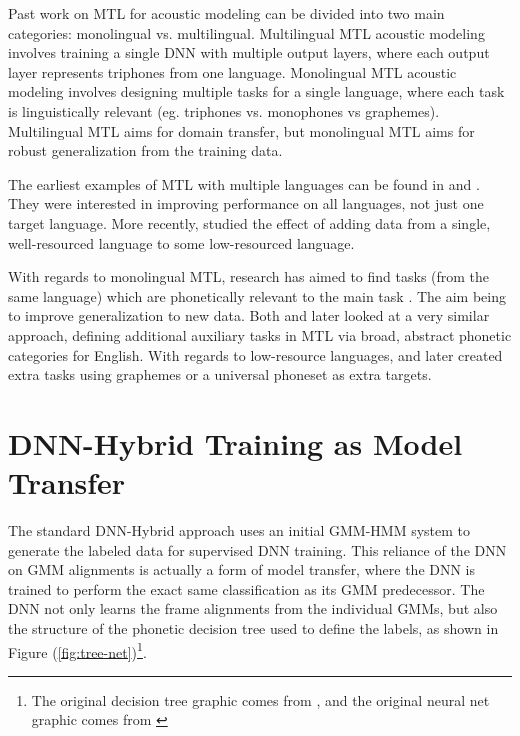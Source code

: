 \documentclass[a4paper]{article}
\begin{document}
Past work on MTL for acoustic modeling can be divided into two main categories: monolingual vs. multilingual. Multilingual MTL acoustic modeling involves training a single DNN with multiple output layers, where each output layer represents triphones from one language. Monolingual MTL acoustic modeling involves designing multiple tasks for a single language, where each task is linguistically relevant (eg. triphones vs. monophones vs graphemes). Multilingual MTL aims for domain transfer, but monolingual MTL aims for robust generalization from the training data.

The earliest examples of MTL with multiple languages can be found in \cite{huang2013} and \cite{heigold2013}. They were interested in improving performance on all languages, not just one target language. More recently, \cite{grezl2016} studied the effect of adding data from a single, well-resourced language to some low-resourced language.

With regards to monolingual MTL, research has aimed to find tasks (from the same language) which are phonetically relevant to the main task \cite{bell2015}. The aim being to improve generalization to new data. Both \cite{seltzer2013} and later \cite{huang2015} looked at a very similar approach, defining additional auxiliary tasks in MTL via broad, abstract phonetic categories for English. With regards to low-resource languages, \cite{chen2014} and later \cite{chen2015} created extra tasks using graphemes or a universal phoneset as extra targets.



\section{DNN-Hybrid Training as Model Transfer}

The standard DNN-Hybrid approach uses an initial GMM-HMM system to generate the labeled data for supervised DNN training. This reliance of the DNN on GMM alignments is actually a form of model transfer, where the DNN is trained to perform the exact same classification as its GMM predecessor. The DNN not only learns the frame alignments from the individual GMMs, but also the structure of the phonetic decision tree used to define the labels, as shown in Figure (\ref{fig:tree-net})\footnote{The original decision tree graphic comes from \cite{young2002}, and the original neural net graphic comes from \cite{heigold2013}}.
\end{document}
